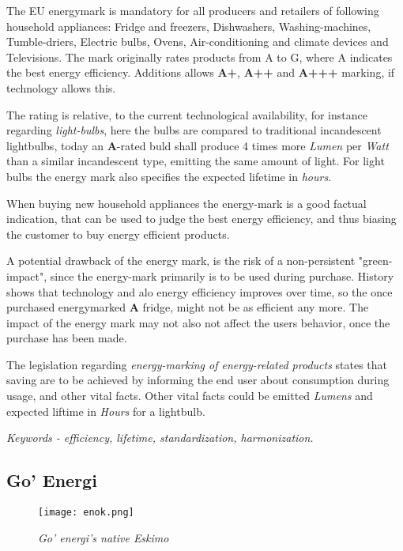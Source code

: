 \documentclass[journal]{IEEEtran}
\begin{document}
The EU energymark is mandatory for all producers and retailers of following household appliances: 
Fridge and freezers, Dishwashers, Washing-machines, Tumble-driers, Electric bulbs, Ovens, 
Air-conditioning and climate devices and Televisions.
The mark originally rates products from A to G, where A indicates the best energy efficiency. 
Additions allows \textbf{A+}, \textbf{A++} and \textbf{A+++} marking, if technology allows this. 

The rating is relative, to the current technological availability, for instance regarding \textit{light-bulbs}, 
here the bulbs are compared to traditional incandescent lightbulbs, today an \textbf{A}-rated buld shall produce 4 times more \textit{Lumen} per \textit{Watt} than a similar incandescent type, emitting the same amount of light. For light  bulbs the energy mark also specifies the expected lifetime in \textit{hours}.

When buying new household appliances the energy-mark is a good factual indication, that can be used to judge the
best energy efficiency, and thus biasing the customer to buy energy efficient products. 

A potential drawback of the energy mark, is the risk of a non-persistent "green-impact", since the energy-mark 
primarily is to be used during purchase. History shows that technology and alo energy efficiency improves over time, so the once purchased energymarked \textbf{A} fridge, might not be as efficient any more. The impact of the energy mark may not also not affect the users behavior, once the purchase has been made.  

The legislation regarding \textit{energy-marking of energy-related products} states that saving are to be achieved by informing the end user about consumption during usage, and other vital facts. Other vital facts could be emitted \textit{Lumens} and expected liftime in \textit{Hours} for a lightbulb. 


\textit{Keywords - efficiency, lifetime, standardization, harmonization.}

\subsection{Go' Energi}
\begin{figure}
\texttt{[image: enok.png]}
\caption{\textit{Go' energi's native Eskimo}}			
\label{fig:enok} %
\end{figure}
\end{document}
